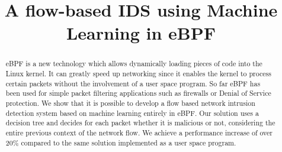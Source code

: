 \documentclass[conference]{IEEEtran}
\begin{document}
\title{A flow-based IDS using Machine Learning in eBPF}

\author{
}





\maketitle%



\begin{abstract}
eBPF is a new technology which allows dynamically loading pieces of code into the Linux kernel. It can greatly speed up networking since it enables the kernel to process certain packets without the involvement of a user space program. So far eBPF has been used for simple packet filtering applications such as firewalls or Denial of Service protection. We show that it is possible to develop a flow based network intrusion detection system based on machine learning entirely in eBPF. Our solution uses a decision tree and decides for each packet whether it is malicious or not, considering the entire previous context of the network flow. We achieve a performance increase of over 20\% compared to the same solution implemented as a user space program. 
\end{abstract}
\end{document}
